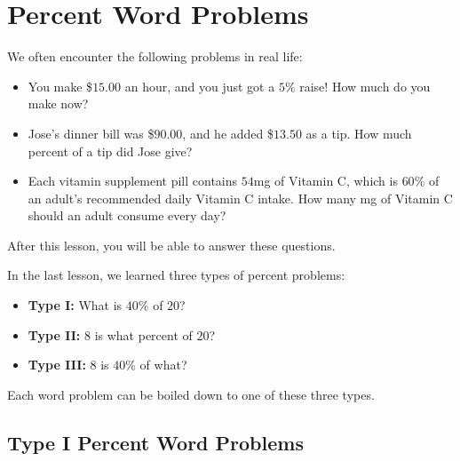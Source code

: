 
\section{Percent Word Problems}

We often encounter the following problems in real life:

\begin{itemize}
\item You make \$$15.00$ an hour, and you just got a $5\%$ raise! How much do you make now?
\item Jose's dinner bill was \$$90.00$, and he added \$$13.50$ as a tip. How much percent of a tip did Jose give?
\item Each vitamin supplement pill contains $54$mg of Vitamin C, which is $60\%$ of an adult's recommended daily Vitamin C intake. How many mg of Vitamin C should an adult consume every day?
\end{itemize}

After this lesson, you will be able to answer these questions.

In the last lesson, we learned three types of percent problems:
\begin{itemize}
\item \textbf{Type I:} What is $40\%$ of $20$?
\item \textbf{Type II:} $8$ is what percent of $20$?
\item \textbf{Type III:} $8$ is $40\%$ of what?
\end{itemize}

Each word problem can be boiled down to one of these three types.

\subsection{Type I Percent Word Problems}

